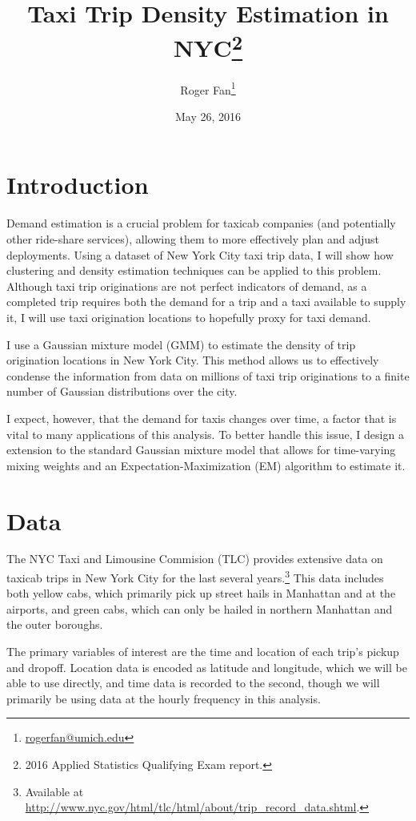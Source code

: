 \documentclass[12pt]{article}
\theoremstyle{definition}
\theoremstyle{algodesc}
\begin{document}
\title{Taxi Trip Density Estimation in NYC\thanks{2016 Applied Statistics Qualifying Exam report.}}
\author{
    Roger Fan\footnote{\url{rogerfan@umich.edu}}
}
\date{May 26, 2016}

\maketitle


\section{Introduction}
Demand estimation is a crucial problem for taxicab companies (and potentially other ride-share services), allowing them to more effectively plan and adjust deployments. Using a dataset of New York City taxi trip data, I will show how clustering and density estimation techniques can be applied to this problem. Although taxi trip originations are not perfect indicators of demand, as a completed trip requires both the demand for a trip and a taxi available to supply it, I will use taxi origination locations to hopefully proxy for taxi demand.

I use a Gaussian mixture model (GMM) to estimate the density of trip origination locations in New York City. This method allows us to effectively condense the information from data on millions of taxi trip originations to a finite number of Gaussian distributions over the city.

I expect, however, that the demand for taxis changes over time, a factor that is vital to many applications of this analysis. To better handle this issue, I design a extension to the standard Gaussian mixture model that allows for time-varying mixing weights and an Expectation-Maximization (EM) algorithm to estimate it.


\section{Data}
The NYC Taxi and Limousine Commision (TLC) provides extensive data on taxicab trips in New York City for the last several years.\footnote{Available at \url{http://www.nyc.gov/html/tlc/html/about/trip_record_data.shtml}.} This data includes both yellow cabs, which primarily pick up street hails in Manhattan and at the airports, and green cabs, which can only be hailed in northern Manhattan and the outer boroughs.

The primary variables of interest are the time and location of each trip's pickup and dropoff. Location data is encoded as latitude and longitude, which we will be able to use directly, and time data is recorded to the second, though we will primarily be using data at the hourly frequency in this analysis.
\end{document}
